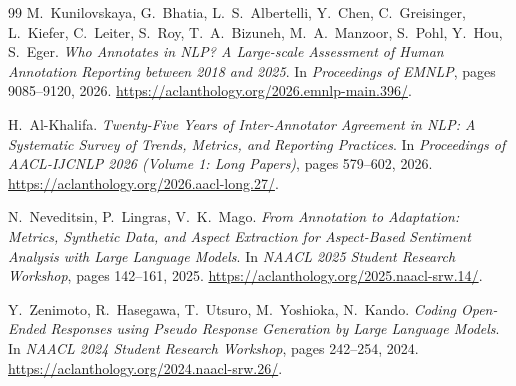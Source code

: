 \documentclass[11pt,a4paper]{article}
\begin{document}
\begin{thebibliography}{99}
M.~Kunilovskaya, G.~Bhatia, L.~S.~Albertelli, Y.~Chen, C.~Greisinger,
L.~Kiefer, C.~Leiter, S.~Roy, T.~A.~Bizuneh, M.~A.~Manzoor, S.~Pohl,
Y.~Hou, S.~Eger.
\newblock \emph{Who Annotates in NLP? A Large-scale Assessment of Human Annotation Reporting between 2018 and 2025}.
\newblock In \emph{Proceedings of EMNLP}, pages 9085--9120, 2026.
\newblock \url{https://aclanthology.org/2026.emnlp-main.396/}.

H.~Al-Khalifa.
\newblock \emph{Twenty-Five Years of Inter-Annotator Agreement in NLP: A Systematic Survey of Trends, Metrics, and Reporting Practices}.
\newblock In \emph{Proceedings of AACL-IJCNLP 2026 (Volume 1: Long Papers)}, pages 579--602, 2026.
\newblock \url{https://aclanthology.org/2026.aacl-long.27/}.

N.~Neveditsin, P.~Lingras, V.~K.~Mago.
\newblock \emph{From Annotation to Adaptation: Metrics, Synthetic Data, and Aspect Extraction for Aspect-Based Sentiment Analysis with Large Language Models}.
\newblock In \emph{NAACL 2025 Student Research Workshop}, pages 142--161, 2025.
\newblock \url{https://aclanthology.org/2025.naacl-srw.14/}.

Y.~Zenimoto, R.~Hasegawa, T.~Utsuro, M.~Yoshioka, N.~Kando.
\newblock \emph{Coding Open-Ended Responses using Pseudo Response Generation by Large Language Models}.
\newblock In \emph{NAACL 2024 Student Research Workshop}, pages 242--254, 2024.
\newblock \url{https://aclanthology.org/2024.naacl-srw.26/}.

\end{thebibliography}
\end{document}
